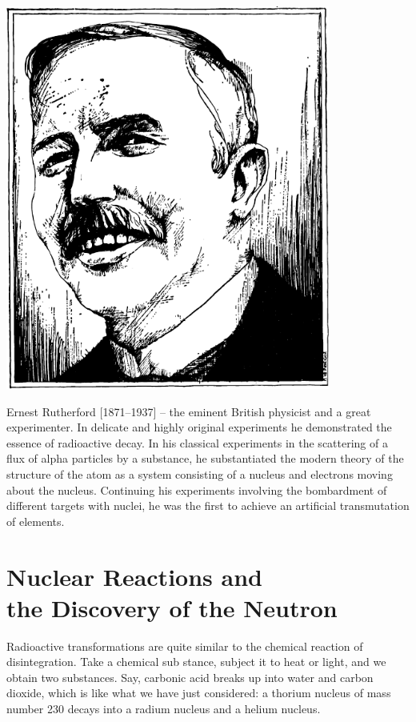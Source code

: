 \begin{center}
\includegraphics[width=0.8\textwidth]{figures/rutherford.pdf}
\end{center}
{\small \textsf{{Ernest Rutherford [1871--1937]}} -- \textsf{\footnotesize the eminent British physicist and a great experimenter. In delicate and highly original experi­ments he demonstrated the essence of radioactive decay. In his classical experiments in the scattering of a flux of alpha particles by a substance, he substantiated the modern theory of the structure of the atom as a system consisting of a nucleus and electrons moving about the nucleus. Continuing his experiments involving the bom­bardment of different targets with nuclei, he was the first to achieve an artificial transmutation of elements.}}




\section[Nuclear Reactions]{Nuclear Reactions and \\the Discovery of the Neutron}

Radioactive transformations are quite similar to the chemical reaction of disintegration. Take a chemical sub­ stance, subject it to heat or light, and we obtain two substances. Say, carbonic acid breaks up into water and carbon dioxide, which is like what we have just consid­ered: a thorium nucleus of mass number 230 decays into a radium nucleus and a helium nucleus.

